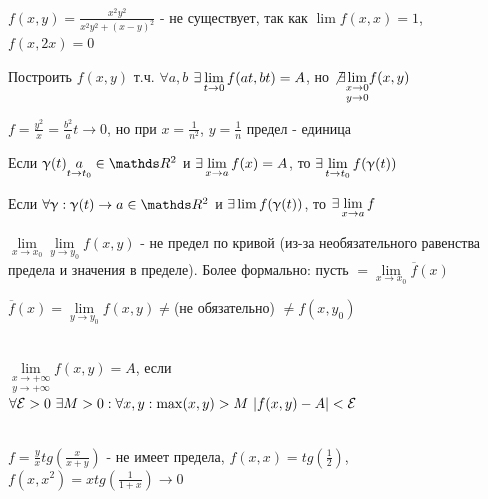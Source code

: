 \documentclass[11pt]{article}
\begin{document}
\begin{instance}\\
    $f(x,y)=\frac{x^2 y^2}{x^2 y^2 + (x-y)^2}$ - не существует, так как $\lim f(x,x)=1$, $f(x,2x)=0$
\end{instance}

\begin{instance}
    Построить $f(x,y)$ т.ч. $\forall a,b$ $\exists \lim\limits_{t \rightarrow 0} f(at,bt)=A$, но $\not \exists \underset{y \rightarrow 0}{\lim\limits_{x \rightarrow 0}} f(x,y)$
    
    $f=\frac{y^2}{x}=\frac{b^2}{a} t \rightarrow 0$, но при $x=\frac{1}{n^2}$, $y=\frac{1}{n}$ предел - единица
\end{instance}

\begin{comments}
    Если $\upgamma(t) \underset{t \rightarrow t_0}{a} \in \R^2$ и $\exists \lim\limits_{x \rightarrow a} f(x)=A$, то $\exists \lim\limits_{t \rightarrow t_0} f(\upgamma(t))$
\end{comments}

\begin{comments}
    Если $\forall \upgamma: \upgamma(t) \rightarrow a \in \R^2$ и $\exists \lim f(\upgamma(t))$, то $\exists \lim\limits_{x \rightarrow a} f$
\end{comments}

\begin{comments}
    $\lim\limits_{x \rightarrow x_0} \lim\limits_{y \rightarrow y_0} f(x,y)$ - не предел по кривой (из-за необязательного равенства предела и значения в пределе). Более формально: пусть $=\lim\limits_{x \rightarrow x_0} \overline{f}(x)$
    
    $\overline{f}(x)=\lim\limits_{y \rightarrow y_0} f(x,y) \neq$(не обязательно) $\neq f(x,y_0)$
\end{comments}

\begin{definition}\\
    $\underset{y \rightarrow +\infty}{\lim\limits_{x \rightarrow +\infty}} f(x,y)=A$, если $\forall \mathcal{E}>0 \ \exists M>0: \forall x,y: \max(x,y)>M \ |f(x,y)-A|<\mathcal{E}$
\end{definition}

\begin{instance}\\
    $f=\frac{y}{x} tg(\frac{x}{x+y})$ - не имеет предела, $f(x,x)=tg(\frac{1}{2})$, $f(x,x^2)=x tg(\frac{1}{1+x}) \rightarrow 0$
\end{instance}

\newpage
\end{document}
